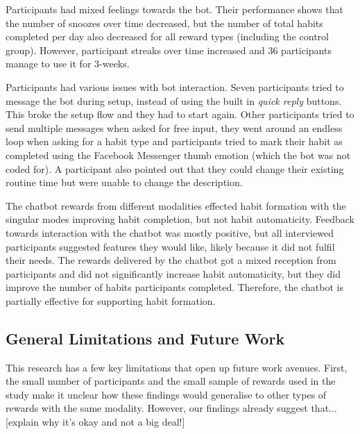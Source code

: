 \documentclass{scaffold/sigchi}
\begin{document}
Participants had mixed feelings towards the bot. Their performance shows that the number of snoozes over time decreased, but the number of total habits completed per day also decreased for all reward types (including the control group). However, participant streaks over time increased and 36 participants manage to use it for 3-weeks.

Participants had various issues with bot interaction. Seven participants tried to message the bot during setup, instead of using the built in \textit{quick reply} buttons. This broke the setup flow and they had to start again. Other participants tried to send multiple messages when asked for free input, they went around an endless loop when asking for a habit type and participants tried to mark their habit as completed using the Facebook Messenger thumb emotion (which the bot was not coded for). A participant also pointed out that they could change their existing routine time but were unable to change the description.


The chatbot rewards from different modalities effected habit formation with the singular modes improving habit completion, but not habit automaticity. Feedback towards interaction with the chatbot was mostly positive, but all interviewed participants suggested features they would like, likely because it did not fulfil their needs. The rewards delivered by the chatbot got a mixed reception from participants and did not significantly increase habit automaticity, but they did improve the number of habits participants completed. Therefore, the chatbot is partially effective for supporting habit formation.


\subsection{General Limitations and Future Work}
This research has a few key limitations that open up future work avenues. First, the small number of participants and the small sample of rewards used in the study make it unclear how these findings would generalise to other types of rewards with the same modality. However, our findings already suggest that...  [explain why it's okay and not a big deal!]
\end{document}
